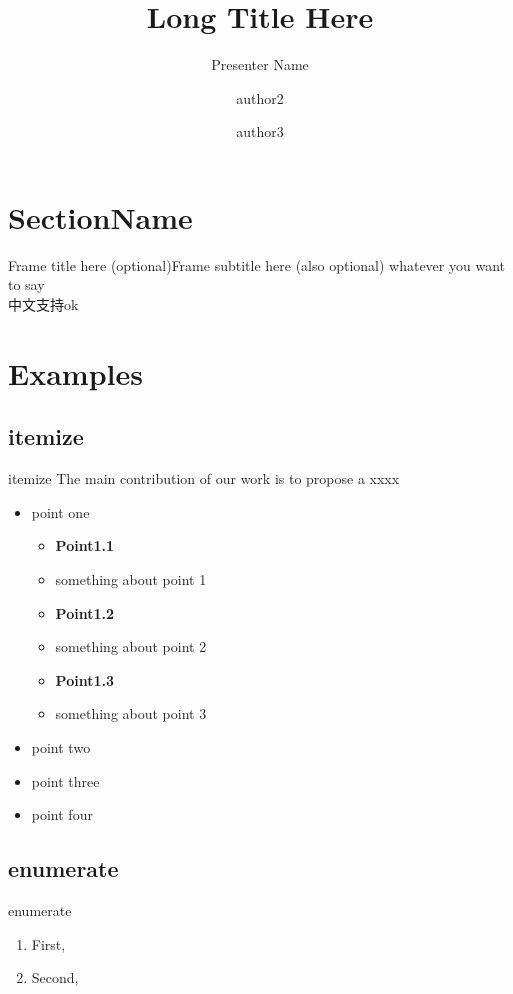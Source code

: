 \documentclass{beamer}
\title[Short Title]{Long Title Here}
\author[Presenter Name]{Presenter Name\inst{1} \and  author2\inst{1} \and author3\inst{2}}
\institute[SYSU University] %
{
  \inst{1} School of Computer Science, Fudan University, Shanghai, China \\
  \inst{2} Shanghai Key Laboratory of Data Science, Shanghai, China 
}
\begin{document}
\begin{frame}
  \titlepage
\end{frame}

\section{SectionName}
\begin{frame}{Frame title here (optional)}{Frame subtitle here (also optional)}
  whatever you want to say\\
  中文支持ok
\end{frame}

\section{Examples}
\subsection{itemize}
\begin{frame}[t]{itemize}
  The main contribution of our work is to propose a xxxx
  \begin{itemize}
    \item point one
          \begin{itemize}
            \item \textbf{Point1.1}
            \item something about point 1
            \item \textbf{Point1.2}
            \item something about point 2
            \item \textbf{Point1.3}
            \item something about point 3
          \end{itemize}
    \item point two
    \item point three
    \item point four
  \end{itemize}
\end{frame}

\subsection{enumerate}
\begin{frame}[t]{enumerate}
  \begin{enumerate}
    \item First,
    \item Second,
  \end{enumerate}
\end{frame}
\end{document}
